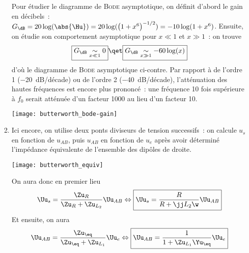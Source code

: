 \documentclass[a4paper, 12pt, final, garamond]{book}
\begin{document}
\begin{enumerate}
        \vspace{-24pt}
        \begin{minipage}{0.48\linewidth}
            Pour étudier le diagramme de \textsc{Bode} asymptotique, on définit
            d'abord le gain en décibels~: $G_{\dB} = 20\log(\abs{\Hu}) =
            20\log(\left( 1+x^6 \right)^{-1/2}) = -10\log(1+x^6)$. Ensuite, on
            étudie son comportement asymptotique pour $x \ll 1$ et $x \gg 1$~:
            on trouve
            \begin{gather*}
                \boxed{G_{\dB} \underset{x \ll 1}{\sim} 0}
                \qet
                \boxed{G_{\dB} \underset{x \gg 1}{\sim} -60\log(x)}
            \end{gather*}
            d'où le diagramme de \textsc{Bode} asymptotique ci-contre. Par
            rapport à de l'ordre 1 (\SI{-20}{dB/décade}) ou de l'ordre 2
            (\SI{-40}{dB/décade}), l'atténuation des hautes fréquences est
            encore plus prononcé~: une fréquence 10 fois supérieure à $f_0$
            serait atténuée d'un facteur 1000 au lieu d'un facteur 10.
        \end{minipage}
        \hfill
        \begin{minipage}{0.48\linewidth}
            \begin{center}
                \texttt{[image: butterworth\_bode-gain]}
            \end{center}
        \end{minipage}
    \item Ici encore, on utilise deux ponts diviseurs de tension successifs~: on
        calcule $u_s$ en fonction de $u_{AB}$, puis $u_{AB}$ en fonction de
        $u_e$ après avoir déterminé l'impédance équivalente de l'ensemble des
        dipôles de droite.
        \begin{center}
            \texttt{[image: butterworth\_equiv]}
        \end{center}
        On aura donc en premier lieu
        \begin{gather*}
            \Uu_s = \frac{\Zu_R}{\Zu_R + \Zu_{L_2}}\Uu_{AB}
            \Leftrightarrow
            \boxed{\Uu_s = \frac{R}{R+\jj L_2\w}\Uu_{AB}}
        \end{gather*}
        Et ensuite, on aura
        \begin{gather*}
            \Uu_{AB} = \frac{\Zu_{\eq}}{\Zu_{\eq} + \Zu_{L_1}}\Uu_e
            \Leftrightarrow
            \boxed{\Uu_{AB} = \frac{1}{1+\Zu_{L_1}\Yu_{\eq}}\Uu_e}

\end{gather*}
\end{enumerate}
\end{document}
